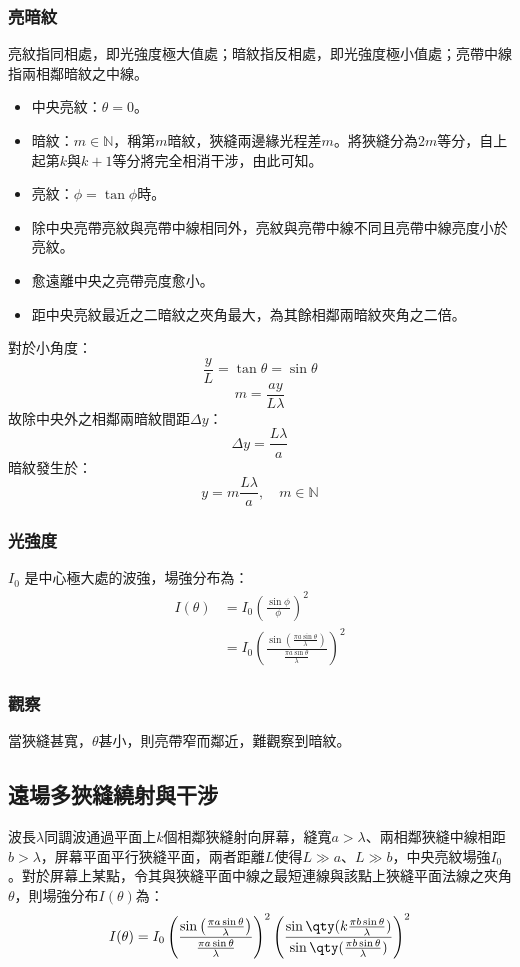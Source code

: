 \documentclass[a4paper,12pt]{report}
\begin{document}
\subsubsection{亮暗紋}
亮紋指同相處，即光強度極大值處；暗紋指反相處，即光強度極小值處；亮帶中線指兩相鄰暗紋之中線。
\begin{itemize}
\item 中央亮紋：$\theta=0$。
\item 暗紋：$m\in\mathbb{N}$，稱第$m$暗紋，狹縫兩邊緣光程差$m$。將狹縫分為$2m$等分，自上起第$k$與$k+1$等分將完全相消干涉，由此可知。
\item 亮紋：$\phi=\tan\phi$時。
\item 除中央亮帶亮紋與亮帶中線相同外，亮紋與亮帶中線不同且亮帶中線亮度小於亮紋。
\item 愈遠離中央之亮帶亮度愈小。
\item 距中央亮紋最近之二暗紋之夾角最大，為其餘相鄰兩暗紋夾角之二倍。
\end{itemize}
對於小角度：
\[\frac{y}{L}=\tan\theta=\sin\theta\]
\[m=\frac{ay}{L\lambda}\]
故除中央外之相鄰兩暗紋間距$\Delta y$：
\[\Delta y=\frac{L\lambda}{a}\]
暗紋發生於：
\[y=m\frac{L\lambda}{a},\quad m\in\mathbb{N}\]
\subsubsection{光強度}
\( I_0 \) 是中心極大處的波強，場強分布為：
\[\begin{aligned}
I(\theta) &= I_0 \left( \frac{\sin\phi}{\phi} \right)^2\\
&= I_0 \left( \frac{\sin \left( \frac{\pi a \sin\theta}{\lambda} \right)}{\frac{\pi a \sin\theta}{\lambda}} \right)^2
\end{aligned}\]
\subsubsection{觀察}
當狹縫甚寬，$\theta$甚小，則亮帶窄而鄰近，難觀察到暗紋。
\subsection{遠場多狹縫繞射與干涉}
波長$\lambda$同調波通過平面上$k$個相鄰狹縫射向屏幕，縫寬$a>\lambda$、兩相鄰狹縫中線相距$b>\lambda$，屏幕平面平行狹縫平面，兩者距離$L$使得$L\gg a$、$L\gg b$，中央亮紋場強$I_0$。對於屏幕上某點，令其與狹縫平面中線之最短連線與該點上狹縫平面法線之夾角$\theta$，則場強分布$I(\theta)$為：
\[I(\theta) = I_0\left( \frac{\sin \left( \frac{\pi a \sin\theta}{\lambda} \right)}{\frac{\pi a \sin\theta}{\lambda}} \right)^2\left(\frac{\sin\qty(k\frac{\pi b\sin\theta}{\lambda})}{\sin\qty(\frac{\pi b\sin\theta}{\lambda})}\right)^2\]
\end{document}
